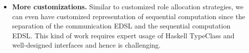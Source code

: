 \begin{itemize}
    \item \textbf{More customizations. } Similar to customized role allocation strategies, we can even have customized representation of sequential computation since the separation of the communication EDSL and the sequential computation EDSL. This kind of work requires expert usage of Haskell TypeClass and well-designed interfaces and hence is challenging.
\end{itemize}